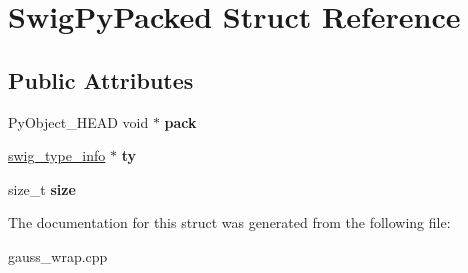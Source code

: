 \hypertarget{struct_swig_py_packed}{\section{Swig\-Py\-Packed Struct Reference}
\label{struct_swig_py_packed}
}
\subsection*{Public Attributes}
\begin{DoxyCompactItemize}
\item 
\hypertarget{struct_swig_py_packed_af5122bcb9e73bf2dec4ce5f58f004e1b}{Py\-Object\-\_\-\-H\-E\-A\-D void $\ast$ {\bfseries pack}}\label{struct_swig_py_packed_af5122bcb9e73bf2dec4ce5f58f004e1b}

\item 
\hypertarget{struct_swig_py_packed_aa6f6be0a8a1bff7710200fbe8d51acf0}{\hyperlink{structswig__type__info}{swig\-\_\-type\-\_\-info} $\ast$ {\bfseries ty}}\label{struct_swig_py_packed_aa6f6be0a8a1bff7710200fbe8d51acf0}

\item 
\hypertarget{struct_swig_py_packed_aed2bfb8fb3c9f804c386215db63921cb}{size\-\_\-t {\bfseries size}}\label{struct_swig_py_packed_aed2bfb8fb3c9f804c386215db63921cb}

\end{DoxyCompactItemize}


The documentation for this struct was generated from the following file\-:\begin{DoxyCompactItemize}
\item 
gauss\-\_\-wrap.\-cpp\end{DoxyCompactItemize}
